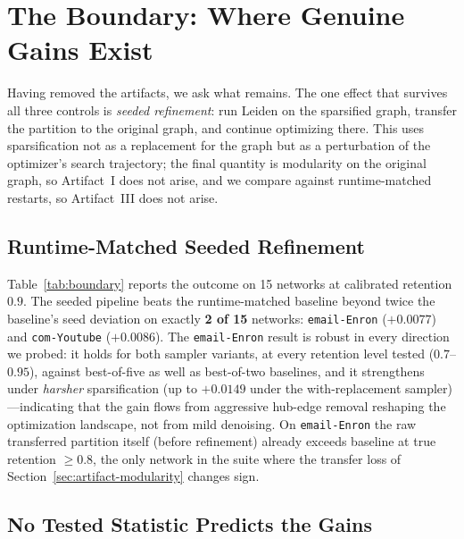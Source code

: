 \section{The Boundary: Where Genuine Gains Exist}
\label{sec:boundary}

Having removed the artifacts, we ask what remains.
The one effect that survives all three controls is \emph{seeded refinement}: run Leiden on the sparsified graph, transfer the partition to the original graph, and continue optimizing there.
This uses sparsification not as a replacement for the graph but as a perturbation of the optimizer's search trajectory; the final quantity is modularity on the original graph, so Artifact~I does not arise, and we compare against runtime-matched restarts, so Artifact~III does not arise.

\subsection{Runtime-Matched Seeded Refinement}
\label{sec:boundary-seeded}



Table~\ref{tab:boundary} reports the outcome on 15 networks at calibrated retention $0.9$.
The seeded pipeline beats the runtime-matched baseline beyond twice the baseline's seed deviation on exactly \textbf{2 of 15} networks: \texttt{email-Enron} ($+0.0077$) and \texttt{com-Youtube} ($+0.0086$).
The \texttt{email-Enron} result is robust in every direction we probed: it holds for both sampler variants, at every retention level tested ($0.7$--$0.95$), against best-of-five as well as best-of-two baselines, and it strengthens under \emph{harsher} sparsification (up to $+0.0149$ under the with-replacement sampler)---indicating that the gain flows from aggressive hub-edge removal reshaping the optimization landscape, not from mild denoising.
On \texttt{email-Enron} the raw transferred partition itself (before refinement) already exceeds baseline at true retention $\ge 0.8$, the only network in the suite where the transfer loss of Section~\ref{sec:artifact-modularity} changes sign.

\subsection{No Tested Statistic Predicts the Gains}
\label{sec:boundary-predictor}



